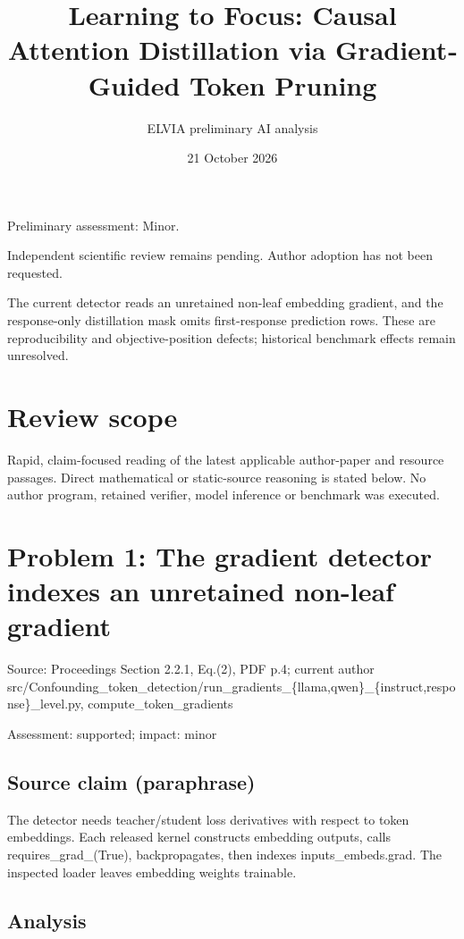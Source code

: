 \documentclass[11pt]{article}
\begin{document}
\title{Learning to Focus: Causal Attention Distillation via Gradient‐Guided Token Pruning}

\author{ELVIA preliminary AI analysis}\date{21 October 2026}\maketitle

Preliminary assessment: Minor.\par

Independent scientific review remains pending. Author adoption has not been requested.

The current detector reads an unretained non-leaf embedding gradient, and the response-only distillation mask omits first-response prediction rows. These are reproducibility and objective-position defects; historical benchmark effects remain unresolved.

\section*{Review scope}

Rapid, claim-focused reading of the latest applicable author-paper and resource passages. Direct mathematical or static-source reasoning is stated below. No author program, retained verifier, model inference or benchmark was executed.

\section*{Problem 1: The gradient detector indexes an unretained non-leaf gradient}

Source: Proceedings Section 2.2.1, Eq.(2), PDF p.4; current author src/Confounding\_token\_detection/run\_gradients\_\{llama,qwen\}\_\{instruct,response\}\_level.py, compute\_token\_gradients

Assessment: supported; impact: minor

\subsection*{Source claim (paraphrase)}

The detector needs teacher/student loss derivatives with respect to token embeddings. Each released kernel constructs embedding outputs, calls requires\_grad\_(True), backpropagates, then indexes inputs\_embeds.grad. The inspected loader leaves embedding weights trainable.

\subsection*{Analysis}
\end{document}
